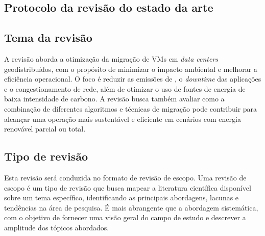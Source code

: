 \documentclass[
	12pt,				%
	oneside,			%
	a4paper,			%
	english,			%
	brazil				%
	]{abntex2ppgsi}
\begin{document}
\begin{apendicesenv}


%
%
%
\chapter{Protocolo da revisão do estado da arte}

\section{Tema da revisão}\label{section:tema-da-revisao}

A revisão aborda a otimização da migração de VMs em \textit{data centers} geodistribuídos, com o propósito de minimizar o impacto ambiental e melhorar a eficiência operacional. O foco é reduzir as emissões de , o \textit{downtime} das aplicações e o congestionamento de rede, além de otimizar o uso de fontes de energia de baixa intensidade de carbono. A revisão busca também avaliar como a combinação de diferentes algoritmos e técnicas de migração pode contribuir para alcançar uma operação mais sustentável e eficiente em cenários com energia renovável parcial ou total.

\section{Tipo de revisão}\label{section:tipo-de-revisao}

Esta revisão será conduzida no formato de revisão de escopo. Uma revisão de escopo é um tipo de revisão que busca mapear a literatura científica disponível sobre um tema específico, identificando as principais abordagens, lacunas e tendências na área de pesquisa. É mais abrangente que a abordagem sistemática, com o objetivo de fornecer uma visão geral do campo de estudo e descrever a amplitude dos tópicos abordados.


\end{apendicesenv}
\end{document}
